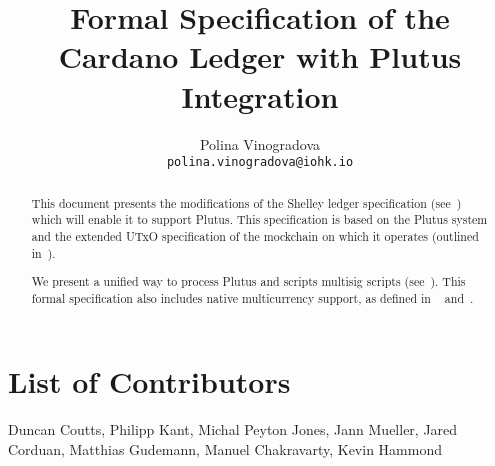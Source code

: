 

\cleardoublepage
\renewcommand{\thepage}{\arabic{page}}
\setcounter{page}{1}

\title{Formal Specification of the Cardano Ledger with Plutus
Integration}

\author{
   Polina Vinogradova \\ {\small \texttt{polina.vinogradova@iohk.io}} \\
   }

\date{}

\maketitle

\begin{abstract}
This document presents the modifications of the Shelley ledger
specification
(see~\cite{shelley_spec}) which will enable it to support Plutus.
This specification is based on the Plutus system and the extended
UTxO specification of the mockchain on which it operates
(outlined in~\cite{plutus_eutxo}).

We present a unified way to process Plutus and scripts multisig scripts
(see~\cite{multi_sig}). This formal specification also includes native multicurrency support,
as defined in
~\cite{multi_currency} and~\cite{formal_multicur}.
\end{abstract}

\section*{List of Contributors}
\label{acknowledgements}

Duncan Coutts,
Philipp Kant,
Michal Peyton Jones,
Jann Mueller,
Jared Corduan,
Matthias Gudemann,
Manuel Chakravarty,
Kevin Hammond
